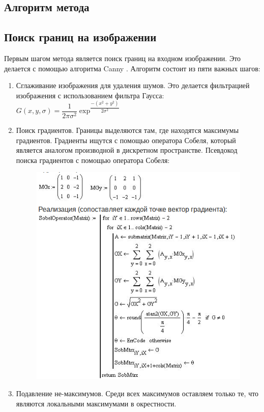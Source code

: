 \subsection{Алгоритм метода}
\subsection{Поиск границ на изображении}
Первым шагом метода является поиск границ на входном изображении. Это делается с помощью алгоритма Canny \cite{b:canny}. Алгоритм состоит из пяти важных шагов:
\begin{enumerate}
	\item Сглаживание изображения для удаления шумов. Это делается фильтрацией изображения с использованием фильтра Гаусса: \newline
	$G(x, y, \sigma) = \dfrac{1}{2\pi\sigma^2}\exp^{\dfrac{-(x^2 + y^2)}{2\sigma^2}}$
	\item Поиск градиентов. Границы выделяются там, где находятся максимумы градиентов. Градиенты ищутся с помощью оператора Собеля, который является аналогом производной в дискретном пространстве. 
	Псевдокод поиска градиентов с помощью оператора Собеля:
	\begin{figure}[!h]
		\centering
		\includegraphics{pictures/sobel}
		\caption[Поиск градиентов]{}
		\label{fig:sobel}
	\end{figure}
	\item Подавление не-максимумов. Среди всех максимумов оставляем только те, что являются локальными максимумами в окрестности.

\end{enumerate}
